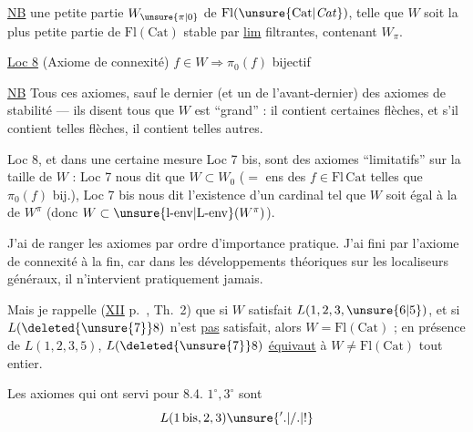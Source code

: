 
\uline{NB}  une petite partie  $W_{\unsure{\pi|0}}$ de $\mathrm{Fl}(\unsure{\mathrm{Cat}|\mathit{Cat}})$, telle que $W$ soit la plus petite partie de $\mathrm{Fl}(\mathrm{Cat})$ stable par \uline{lim} filtrantes, contenant $W_\pi$.


\uline{Loc 8} (Axiome de connexité) $f\in W\Rightarrow\pi_0(f)$ bijectif

\uline{NB} Tous ces axiomes, sauf le dernier (et un  de l'avant-dernier)  des axiomes de stabilité --- ils disent tous que $W$ est ``grand'' : il contient certaines flèches, et s'il contient telles flèches, il contient telles autres.

Loc 8, et dans une certaine mesure Loc 7 bis, sont des axiomes ``limitatifs'' sur la taille de $W$ : Loc 7 nous dit que $W\subset W_0$ ($=$ ens des $f\in\mathrm{Fl}\,\mathrm{Cat}$ telles que $\pi_0(f)$ bij.), Loc 7 bis nous dit l'existence d'un cardinal tel que $W$ soit égal à la  de $W^\pi$ (donc $W\subset\unsure{\mathrm{l}\text{-}\mathrm{env}|\mathrm{L}\text{-}\mathrm{env}}(W^\pi)$).

J'ai  de ranger les axiomes par ordre d'importance pratique. J'ai fini par  l'axiome de connexité à la fin, car dans les développements théoriques sur les localiseurs généraux, il n'intervient pratiquement jamais.

Mais je rappelle (\uline{XII} p.~, Th.~2) que si $W$ satisfait $L(1,2,3,\unsure{6|5})$, et si $L(\deleted{\unsure{7}}8)$ n'est \uline{pas} satisfait,  alors $W=\mathrm{Fl}(\mathrm{Cat})$ ;  en présence de $L(1,2,3,5)$, $L(\deleted{\unsure{7}}8)$ \uline{équivaut} à $W\ne\mathrm{Fl}(\mathrm{Cat})$ tout entier.

Les axiomes qui ont servi pour 8.4. $1^\circ,3^\circ$  sont
\[
 L(1\,\mathrm{bis},2,3)\unsure{'.|/.|!}
\]

